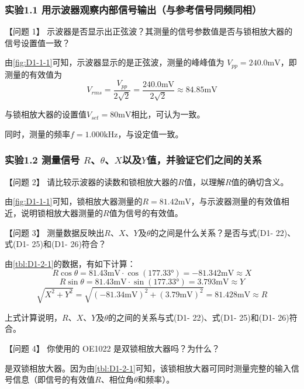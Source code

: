 \documentclass[dvipsnames, svgnames,a4paper,11pt]{article}
\begin{document}
	\subsubsection*{实验1.1 \quad 用示波器观察内部信号输出（与参考信号同频同相）}
		
		【问题 1】 示波器是否显示出正弦波？其测量的信号参数值是否与锁相放大器的信号设置值一致？

		由\cref{fig:D1-1-1}可知，示波器显示的是正弦波，测量的峰峰值为 $V_{pp} = 240.0 \mathrm{mV}$，即测量的有效值为
		\[
			V_{rms} = \frac{V_{pp}}{2 \sqrt{2}} = \frac{240.0 \mathrm{mV}}{2 \sqrt{2}} \approx 84.85 \mathrm{mV}
		\]

		与锁相放大器的设置值$V_{set} = 80 \mathrm{mV}$相比，可认为一致。

		同时，测量的频率$f = 1.000 \mathrm{kHz}$，与设定值一致。




	\subsubsection*{实验1.2 \quad 测量信号 $R$、$\theta$、$X$以及$Y$值，并验证它们之间的关系}

		【问题 2】 请比较示波器的读数和锁相放大器的$R$值，以理解$R$值的确切含义。

		由\cref{fig:D1-1-1}可知，锁相放大器测量的$R = 81.42 \mathrm{mV}$，与示波器测量的有效值相近，说明锁相放大器测量的$R$值为信号的有效值。


		\vspace{0.05\textwidth} %


		【问题 3】 测量数据反映出$R$、$X$、$Y$及$\theta$的之间是什么关系？是否与式(D1- 22)、式(D1- 25)和(D1- 26)符合？

		由\cref{tbl:D1-2-1}的数据，有如下计算：
		\[
			R \cos\theta = 81.43 \mathrm{mV} \cdot \cos(177.33°) = -81.342 \mathrm{mV} \approx X 
		\]
		\[
			R \sin\theta = 81.43 \mathrm{mV} \cdot \sin(177.33°) = 3.793 \mathrm{mV} \approx Y 
		\]
		\[
			\sqrt{X^2 + Y^2} = \sqrt{(-81.34 \mathrm{mV})^2 + (3.79 \mathrm{mV})^2} = 81.428 \mathrm{mV} \approx R
		\]

		上式计算说明，$R$、$X$、$Y$及$\theta$的之间的关系与式(D1- 22)、式(D1- 25)和(D1- 26)符合。


		\vspace{0.05\textwidth} %


		【问题 4】 你使用的 OE1022 是双锁相放大器吗？为什么？

		是双锁相放大器。因为由\cref{tbl:D1-2-1}可知，该锁相放大器可同时测量完整的输入信号信息（即信号的有效值$R$、相位角$\theta$和频率）。
\end{document}
